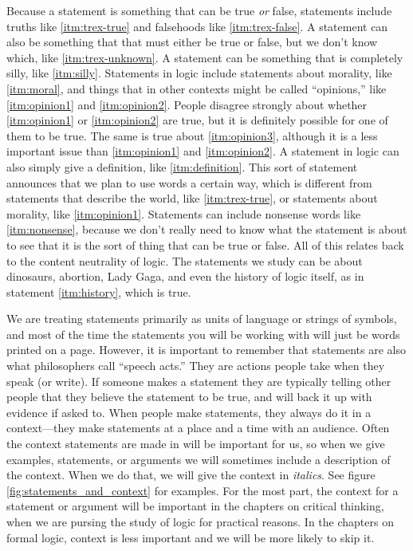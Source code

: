 Because a statement is something that can be true \emph{or} false, statements include truths like \ref{itm:trex-true} and falsehoods like \ref{itm:trex-false}.
A statement can also be something that that must either be true or false, but we don't know which, like \ref{itm:trex-unknown}.
A statement can be something that is completely silly, like \ref{itm:silly}.
Statements in logic include statements about morality, like \ref{itm:moral}, and things that in other contexts might be called ``opinions,'' like \ref{itm:opinion1} and \ref{itm:opinion2}.
People disagree strongly about whether \ref{itm:opinion1} or \ref{itm:opinion2} are true, but it is definitely possible for one of them to be true. The same is true about \ref{itm:opinion3}, although it is a less important issue than \ref{itm:opinion1} and \ref{itm:opinion2}.
A statement in logic can also simply give a definition, like \ref{itm:definition}.
This sort of statement announces that we plan to use words a certain way, which is different from statements that describe the world, like \ref{itm:trex-true}, or statements about morality, like \ref{itm:opinion1}.
Statements can include nonsense words like \ref{itm:nonsense}, because we don't really need to know what the statement is about to see that it is the sort of thing that can be true or false.
All of this relates back to the content neutrality of logic.
The statements we study can be about dinosaurs, abortion, Lady Gaga, and even the history of logic itself, as in statement \ref{itm:history}, which is true.

We are treating statements primarily as units of language or strings of symbols, and most of the time the statements you will be working with will just be words printed on a page. However, it is important to remember that statements are also what philosophers call ``speech acts.'' They are actions people take when they speak (or write). If someone makes a statement they are typically telling other people that they believe the statement to be true, and will back it up with evidence if asked to. When people make statements, they always do it in a context---they make statements at a place and a time with an audience. Often the context statements are made in will be important for us, so when we give examples, statements, or arguments we will sometimes include a description of the context. When we do that, we will give the context in \textit{italics}. See figure \ref{fig:statements_and_context} for examples. For the most part, the context for a statement or argument will be important in the chapters on critical thinking, when we are pursing the study of logic for practical reasons. In the chapters on formal logic, context is less important and we will be more likely to skip it.

